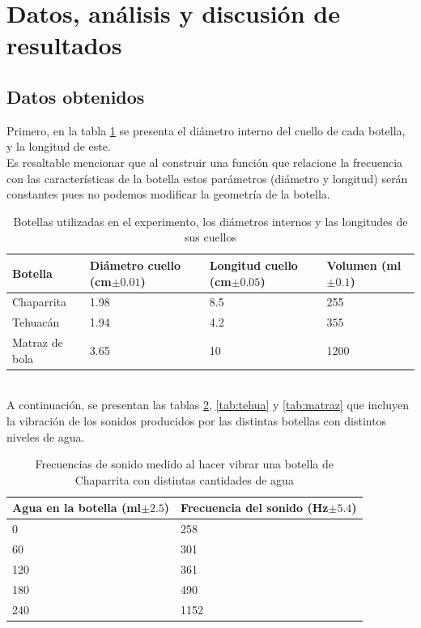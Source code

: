 \documentclass[article,12pt]{elsarticle}
\begin{document}
    \section{Datos, análisis y discusión de resultados}
    
    \subsection{Datos obtenidos}
    Primero, en la tabla \ref{tab:diam} se presenta el diámetro interno del cuello de cada botella, y la longitud de este.\\

    Es resaltable mencionar que al construir una función que relacione la frecuencia con las características de la botella estos parámetros (diámetro y longitud) serán constantes pues no podemos modificar la geometría de la botella.

    \begin{table}[h]
    \centering
    \caption{Botellas utilizadas en el experimento, los diámetros internos y las longitudes de sus cuellos }
    \label{tab:diam}
    \begin{tabular}{@{}lll@{}l}
        \toprule
        Botella & Diámetro cuello (cm$\pm 0.01$) & Longitud cuello (cm$\pm 0.05$)  &Volumen (ml $\pm 0.1$)\\ \midrule
        Chaparrita & 1.98 & 8.5  &255\\
        Tehuacán & 1.94 & 4.2  &355\\
        Matraz de bola & 3.65 & 10  &1200\\ \bottomrule
    \end{tabular}
\end{table}
\\
    
    A continuación, se presentan las tablas \ref{tab:chap}, \ref{tab:tehua} y \ref{tab:matraz} que incluyen la vibración de los sonidos producidos por las distintas botellas con distintos niveles de agua.
    
    \begin{table}[h]
        \centering
        \caption{Frecuencias de sonido medido al hacer vibrar una botella de Chaparrita con distintas cantidades de agua}
        \label{tab:chap}
            \begin{tabular}{@{}ll@{}}
                \toprule
                Agua en la botella (ml$\pm 2.5$) & Frecuencia del sonido (Hz$\pm5.4$) \\ \midrule
                0 & 258 \\
                60 & 301 \\
                120 & 361 \\
                180 & 490 \\
                240 & 1152 \\ \bottomrule
            \end{tabular}%
        \end{table}\\
\end{document}
